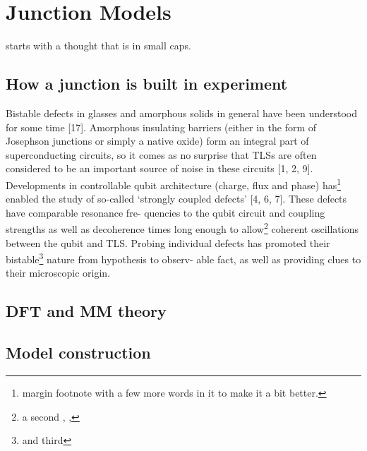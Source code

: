 \chapter{Junction Models}

 starts with a thought that is in small caps.

\section{How a junction is built in experiment}
Bistable defects  in glasses and amorphous solids in general have been understood for some time [17].
Amorphous insulating barriers (either in the form of Josephson junctions or simply a native oxide) form an integral part of superconducting circuits, so it comes as no surprise that TLSs are often considered to be an important source of noise in these circuits [1, 2, 9]. Developments in controllable
qubit architecture (charge, flux and phase) has\footnote{margin footnote with a few more words in it to make it a bit better.} enabled the study of so-called
‘strongly coupled defects’ [4, 6, 7]. These defects have comparable resonance fre-
quencies to the qubit circuit and coupling strengths as well as decoherence times
long enough to allow\footnote{a second \the\marginparwidth, \the\marginparsep, \the\marginparpush} coherent oscillations between the qubit and TLS. Probing
individual defects has promoted their bistable\footnote{and third} nature from hypothesis to observ-
able fact, as well as providing clues to their microscopic origin.
\section{DFT and MM theory}
\section{Model construction}
